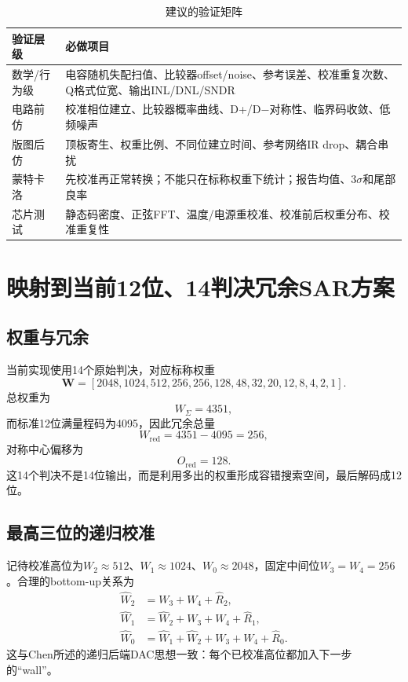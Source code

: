 \documentclass[UTF8,a4paper,11pt]{ctexart}
\begin{document}
\begin{table}[H]
\centering
\caption{建议的验证矩阵}
\begin{tabularx}{\textwidth}{p{3cm}X}
\toprule
验证层级 & 必做项目\\
\midrule
数学/行为级 & 电容随机失配扫值、比较器offset/noise、参考误差、校准重复次数、Q格式位宽、输出INL/DNL/SNDR\\
电路前仿 & 校准相位建立、比较器概率曲线、D+/D$-$对称性、临界码收敛、低频噪声\\
版图后仿 & 顶板寄生、权重比例、不同位建立时间、参考网络IR drop、耦合串扰\\
蒙特卡洛 & 先校准再正常转换；不能只在标称权重下统计；报告均值、$3\sigma$和尾部良率\\
芯片测试 & 静态码密度、正弦FFT、温度/电源重校准、校准前后权重分布、校准重复性\\
\bottomrule
\end{tabularx}
\end{table}

\section{映射到当前12位、14判决冗余SAR方案}

\subsection{权重与冗余}

当前实现使用14个原始判决，对应标称权重
\begin{equation}
\bm W=[2048,1024,512,256,256,128,48,32,20,12,8,4,2,1].
\end{equation}
总权重为
\begin{equation}
W_\Sigma=4351,
\end{equation}
而标准12位满量程码为4095，因此冗余总量
\begin{equation}
W_{\mathrm{red}}=4351-4095=256,
\end{equation}
对称中心偏移为
\begin{equation}
O_{\mathrm{red}}=128.
\end{equation}
这14个判决不是14位输出，而是利用多出的权重形成容错搜索空间，最后解码成12位。

\subsection{最高三位的递归校准}

记待校准高位为$W_2\approx512$、$W_1\approx1024$、$W_0\approx2048$，固定中间位$W_3=W_4=256$。合理的bottom-up关系为
\begin{align}
\widehat W_2&=W_3+W_4+\widehat R_2,\\
\widehat W_1&=\widehat W_2+W_3+W_4+\widehat R_1,\\
\widehat W_0&=\widehat W_1+\widehat W_2+W_3+W_4+\widehat R_0.
\end{align}
这与Chen所述的递归后端DAC思想一致：每个已校准高位都加入下一步的“wall”。
\end{document}
